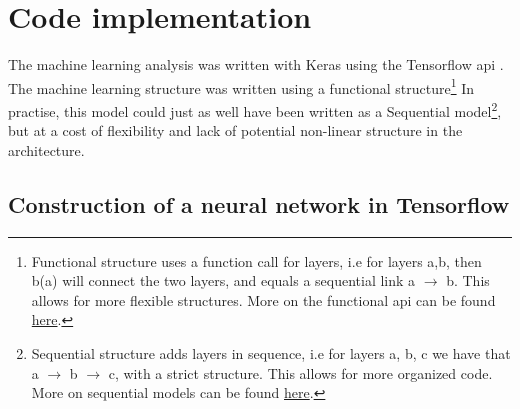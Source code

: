 \section*{Code implementation}

The machine learning analysis was written with Keras\cite{chollet2015keras} using the Tensorflow api\cite{tensorflow2015-whitepaper} . 
The machine learning structure was written using a functional structure\footnote{Functional structure uses a function call for layers, i.e for layers a,b, then b(a) will connect the two layers, and equals a sequential link a $\to$ b. This allows for more flexible structures. More on the functional api can be found \href{https://www.tensorflow.org/guide/keras/functional}{here}.}
In practise, this model could just as well have been written as a Sequential model\footnote{Sequential structure adds layers in sequence, i.e for layers a, b, c we have that a $\to$ b $\to$ c, with a strict structure. This allows for more organized code. More on sequential models can be found \href{https://www.tensorflow.org/guide/keras/sequential_model}{here}.}, 
but at a cost of flexibility and lack of potential non-linear structure in the architecture.\par




\subsection*{Construction of a neural network in Tensorflow}

